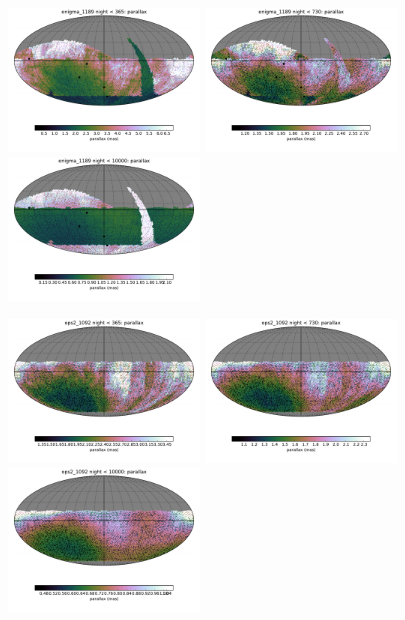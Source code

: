 \begin{figure}[ht]
  \begin{center}
  \includegraphics[width=2.0in]{./figs/milkyway/MW_Astrom_paError_1189_01y_map.pdf}
  \includegraphics[width=2.0in]{./figs/milkyway/MW_Astrom_paError_1189_02y_map.pdf}
  \includegraphics[width=2.0in]{./figs/milkyway/MW_Astrom_paError_1189_10y_map.pdf}
  \end{center}
  \begin{center}
  \includegraphics[width=2.0in]{./figs/milkyway/MW_Astrom_paError_1092_01y_map.pdf}
  \includegraphics[width=2.0in]{./figs/milkyway/MW_Astrom_paError_1092_02y_map.pdf}
  \includegraphics[width=2.0in]{./figs/milkyway/MW_Astrom_paError_1092_10y_map.pdf}
  \end{center}


\end{figure}
